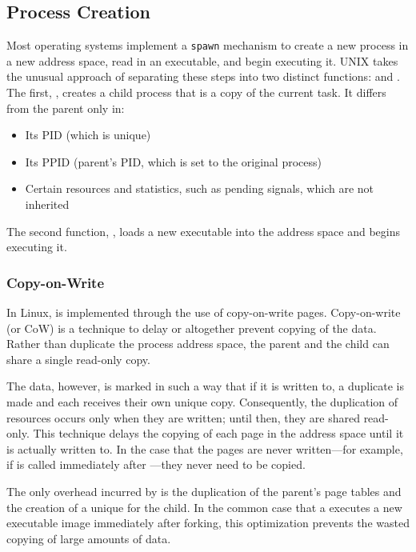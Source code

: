 \subsection{Process Creation}\label{subsec:Process_Creation}
Most operating systems implement a \texttt{spawn} mechanism to create a new process in a new address space, read in an executable, and begin executing it.
UNIX takes the unusual approach of separating these steps into two distinct functions:  and .
The first, , creates a child process that is a copy of the current task.
It differs from the parent only in:
\begin{itemize}[noitemsep]
\item Its PID (which is unique)
\item Its PPID (parent’s PID, which is set to the original process)
\item Certain resources and statistics, such as pending signals, which are not inherited
\end{itemize}

The second function, , loads a new executable into the address space and begins executing it.

\subsubsection{Copy-on-Write}\label{subsubsec:Process_Copy_on_Write}
In Linux,  is implemented through the use of copy-on-write pages.
Copy-on-write (or CoW) is a technique to delay or altogether prevent copying of the data.
Rather than duplicate the process address space, the parent and the child can share a single read-only copy.

The data, however, is marked in such a way that if it is written to, a duplicate is made and each  receives their own unique copy.
Consequently, the duplication of resources occurs only when they are written; until then, they are shared read-only.
This technique delays the copying of each page in the address space until it is actually written to.
In the case that the pages are never written—for example, if  is called immediately after —they never need to be copied.

The only overhead incurred by  is the duplication of the parent’s page tables and the creation of a unique  for the child.
In the common case that a  executes a new executable image immediately after forking, this optimization prevents the wasted copying of large amounts of data.

